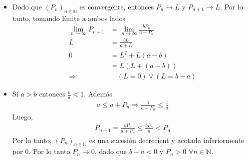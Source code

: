 \documentclass[12pt]{book}
\begin{document}
\begin{itemize}
    \item[\textbf{a)}] Dado que $(P_n)_{n \in \mathbb{N}}$ es convergente, entonces $P_n \to L$ y $P_{n+1} \to L$. Por lo tanto, tomando límite a ambos lados
    \begin{align*}
        \lim_{n \to \infty} P_{n+1}&= \lim_{n \to \infty} \frac{b P_n}{a+ P_n} \\
        L&=\frac{bL}{a+L} \\
        0&=L^2+L(a-b) \\
        &=L(L+(a-b)) \\
        \Longrightarrow& \quad (L=0) \vee (L=b-a)
    \end{align*}

    \item[\textbf{b)}] Si $a>b$ entonces $\displaystyle\frac{b}{a}<1$. Además
    \begin{align*}
        a \leq a+ P_n \Longrightarrow \frac{1}{a+P_n} \leq \frac{1}{a}
    \end{align*}
    Luego,
    \begin{align*}
        P_{n+1}= \frac{bP_n}{a+P_n} \leq \frac{bP_n}{a} < P_n
    \end{align*}
    Por lo tanto, $(P_n)_{n \in \mathbb{N}}$ es una sucesión decrecient y acotada inferiormente por 0. Por lo tanto $P_n \to 0$, dado que $b-a <0$ y $P_n >0$ $\forall n \in \mathbb{N}$.


\end{itemize}
\end{document}
